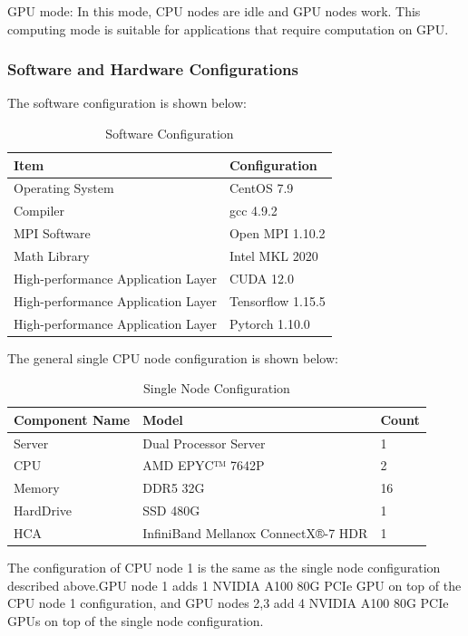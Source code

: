 \documentclass[a4paper,12pt]{article}
\begin{document}
GPU mode: In this mode, CPU nodes are idle and GPU nodes work. This computing mode is suitable for applications that require computation on GPU.

\subsubsection{Software and Hardware Configurations}
The software configuration is shown below:
\begin{table}[H]
	\centering
	\caption{Software Configuration}
	\vspace{0.5cm}
	\begin{tabular}{ll}
		\toprule
		Item & Configuration \\
		\midrule
		Operating System & CentOS 7.9 \\
		Compiler & gcc 4.9.2 \\
		MPI Software & Open MPI 1.10.2 \\
		Math Library & Intel MKL 2020 \\
		High-performance Application Layer & CUDA 12.0 \\
		High-performance Application Layer & Tensorflow 1.15.5 \\
		High-performance Application Layer & Pytorch 1.10.0 \\
		\bottomrule
	\end{tabular}
\end{table}

The general single CPU node configuration is shown below:
\begin{table}[H]
\centering
\caption{Single Node Configuration}
\vspace{0.5cm}
\begin{tabular}{lll}
\toprule
Component Name & Model & Count \\
\midrule
Server & Dual Processor Server & 1 \\
CPU & AMD EPYC™ 7642P & 2 \\
Memory & DDR5 32G & 16 \\
HardDrive & SSD 480G & 1 \\
HCA & InfiniBand Mellanox ConnectX®-7 HDR & 1 \\
\bottomrule
\end{tabular}
\end{table}

The configuration of CPU node 1 is the same as the single node configuration described above.GPU node 1 adds 1 NVIDIA A100 80G PCIe GPU on top of the CPU node 1 configuration, and GPU nodes 2,3 add 4 NVIDIA A100 80G PCIe GPUs on top of the single node configuration.
\end{document}
